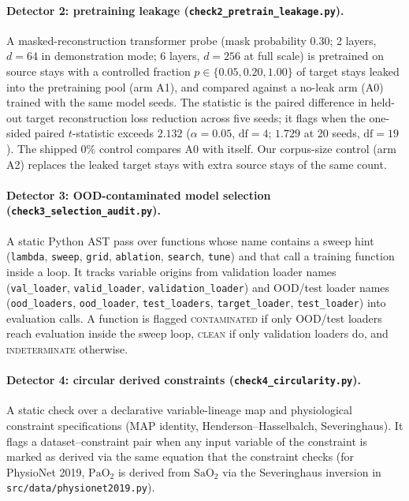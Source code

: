 \documentclass[10pt]{article}
\theoremstyle{definition}
\begin{document}
\paragraph{Detector 2: pretraining leakage (\texttt{check2\_pretrain\_leakage.py}).}
A masked-reconstruction transformer probe (mask probability 0.30; 2 layers, $d=64$ in demonstration mode; 6 layers, $d=256$ at full scale) is pretrained on source stays with a controlled fraction $p\in\{0.05, 0.20, 1.00\}$ of target stays leaked into the pretraining pool (arm A1), and compared against a no-leak arm (A0) trained with the same model seeds. The statistic is the paired difference in held-out target reconstruction loss reduction across five seeds; it flags when the one-sided paired $t$-statistic exceeds $2.132$ ($\alpha=0.05$, $\text{df}=4$; $1.729$ at 20 seeds, $\text{df}=19$). The shipped 0\% control compares A0 with itself. Our corpus-size control (arm A2) replaces the leaked target stays with extra source stays of the same count.

\paragraph{Detector 3: OOD-contaminated model selection (\texttt{check3\_selection\_audit.py}).}
A static Python AST pass over functions whose name contains a sweep hint (\texttt{lambda}, \texttt{sweep}, \texttt{grid}, \texttt{ablation}, \texttt{search}, \texttt{tune}) and that call a training function inside a loop. It tracks variable origins from validation loader names (\texttt{val\_loader}, \texttt{valid\_loader}, \texttt{validation\_loader}) and OOD/test loader names (\texttt{ood\_loaders}, \texttt{ood\_loader}, \texttt{test\_loaders}, \texttt{target\_loader}, \texttt{test\_loader}) into evaluation calls. A function is flagged \textsc{contaminated} if only OOD/test loaders reach evaluation inside the sweep loop, \textsc{clean} if only validation loaders do, and \textsc{indeterminate} otherwise.

\paragraph{Detector 4: circular derived constraints (\texttt{check4\_circularity.py}).}
A static check over a declarative variable-lineage map and physiological constraint specifications (MAP identity, Henderson--Hasselbalch, Severinghaus). It flags a dataset--constraint pair when any input variable of the constraint is marked as derived via the same equation that the constraint checks (for PhysioNet 2019, $\text{PaO}_2$ is derived from $\text{SaO}_2$ via the Severinghaus inversion in \texttt{src/data/physionet2019.py}).
\end{document}

